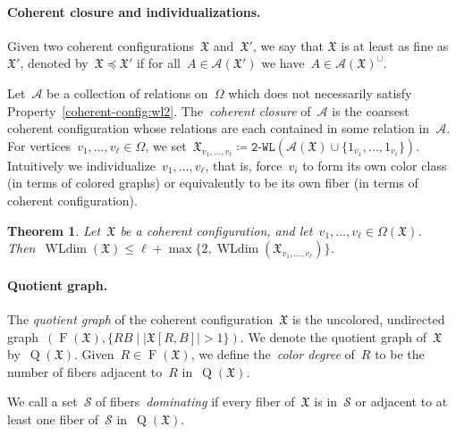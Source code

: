 \documentclass[english,a4paper]{article}
\theoremstyle{plain}
\newtheorem{theorem}             {Theorem}[section]
\theoremstyle{definition}
\newcommand{\abs}[1]{| #1 |}
\DeclareMathOperator{\Fibers}{F}
\newcommand{\coherentConfig}{\ensuremath{\mathfrak{X}}}
\newcommand{\fibers}[1]{\ensuremath{\Fibers \left( #1 \right)}}
\newcommand{\interspace}[2]{\ensuremath{\coherentConfig[#1,#2]}}
\newcommand{\vertices}{\ensuremath{\Omega}}
\newcommand{\relations}{\ensuremath{\mathcal{A}}}
\newcommand{\arcs}{\ensuremath{A}}
\DeclareMathOperator*{\WLdim}{WLdim}
\newcommand{\wldim}[1]{\ensuremath{\WLdim\left(#1\right)}}
\newcommand{\finer}{\preccurlyeq}
\newcommand{\wld}[1]{\texttt{#1-WL}}
\newcommand{\wltwo}{\wld{2}\xspace}
\DeclareMathOperator*{\Quotient}{Q}
\newcommand{\quotientGraph}[1]{\ensuremath{\Quotient(#1)}}
\begin{document}
\paragraph{Coherent closure and individualizations.}
Given two coherent configurations~$\coherentConfig$ and~$\coherentConfig'$, we say that $\coherentConfig$ is at least as fine as~$\coherentConfig'$, denoted by~$\coherentConfig \finer \coherentConfig'$ if for all~$\arcs \in \relations(\coherentConfig')$ we have~$\arcs \in \relations(\coherentConfig)^\cup$.

Let~$\relations$ be a collection of relations on~$\vertices$ which does not necessarily satisfy Property~\ref{coherent-config:wl2}.
The~\emph{coherent closure} of~$\relations$ is the coarsest coherent configuration whose relations are each contained in some relation in~$\relations$.
For vertices~$v_1,\dots, v_\ell \in \vertices$, we set~$\coherentConfig_{v_1,\dots,v_\ell} \coloneqq \wltwo(\relations(\coherentConfig) \cup \{1_{v_1},\dots,1_{v_\ell}\})$.
Intuitively we individualize~$v_1,\dots,v_\ell$, that is, force~$v_i$ to form its own color class (in terms of colored graphs) or equivalently to be its own fiber (in terms of coherent configuration).

\begin{theorem}
\label{preliminaries:wldim-individualizations/thm}
    Let~$\coherentConfig$ be a coherent configuration, and let~$v_1,\dots,v_\ell \in \vertices(\coherentConfig)$.
    Then~$\wldim{\coherentConfig} \leq \ell + \max\{2,\wldim{\coherentConfig_{v_1,\dots,v_\ell}}\}$.
\end{theorem}



\paragraph{Quotient graph.}
The \emph{quotient graph} of the coherent configuration~$\coherentConfig$ is the uncolored, undirected graph~$(\fibers{\coherentConfig}, \{ RB \mid \abs{\interspace{R}{B}} > 1 \})$.
We denote the quotient graph of~$\coherentConfig$ by~$\quotientGraph{\coherentConfig}$.
Given~$R \in \fibers{\coherentConfig}$, we define the~\emph{color degree} of~$R$ to be the number of fibers adjacent to~$R$ in~$\quotientGraph{\coherentConfig}$.

We call a set~$\mathcal{S}$ of fibers~\emph{dominating} if every fiber of~$\coherentConfig$ is in~$\mathcal{S}$ or adjacent to at least one fiber of~$\mathcal{S}$ in~$\quotientGraph{\coherentConfig}$.
\end{document}
